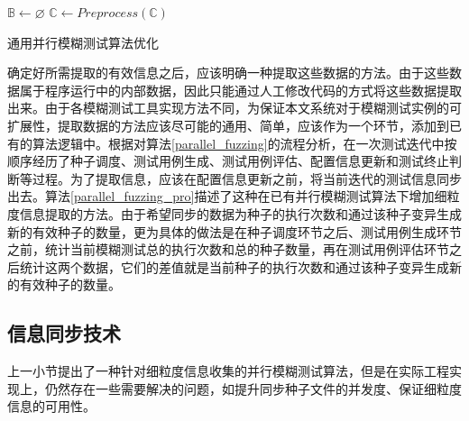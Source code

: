 \documentclass[master]{thesis-uestc}
\begin{document}
\begin{algorithm}[!htbp]
    $\mathbb{B} \leftarrow \varnothing$ \;
    $\mathbb{C} \leftarrow Preprocess(\mathbb{C})$\;
    \caption{通用并行模糊测试算法优化}
    \label{parallel_fuzzing_pro}
\end{algorithm}

确定好所需提取的有效信息之后，应该明确一种提取这些数据的方法。由于这些数据属于程序运行中的内部数据，因此只能通过人工修改代码的方式将这些数据提取出来。由于各模糊测试工具实现方法不同，为保证本文系统对于模糊测试实例的可扩展性，提取数据的方法应该尽可能的通用、简单，应该作为一个环节，添加到已有的算法逻辑中。根据对算法\ref{parallel_fuzzing}的流程分析，在一次测试迭代中按顺序经历了种子调度、测试用例生成、测试用例评估、配置信息更新和测试终止判断等过程。为了提取信息，应该在配置信息更新之前，将当前迭代的测试信息同步出去。算法\ref{parallel_fuzzing_pro}描述了这种在已有并行模糊测试算法下增加细粒度信息提取的方法。由于希望同步的数据为种子的执行次数和通过该种子变异生成新的有效种子的数量，更为具体的做法是在种子调度环节之后、测试用例生成环节之前，统计当前模糊测试总的执行次数和总的种子数量，再在测试用例评估环节之后统计这两个数据，它们的差值就是当前种子的执行次数和通过该种子变异生成新的有效种子的数量。

\subsection{信息同步技术}

上一小节提出了一种针对细粒度信息收集的并行模糊测试算法，但是在实际工程实现上，仍然存在一些需要解决的问题，如提升同步种子文件的并发度、保证细粒度信息的可用性。
\end{document}
